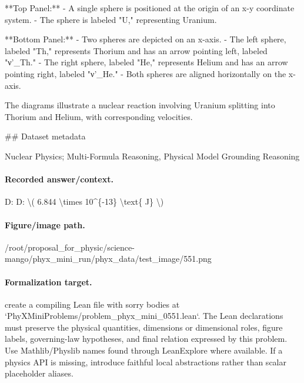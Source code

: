 **Top Panel:**
- A single sphere is positioned at the origin of an x-y coordinate system.
- The sphere is labeled "U," representing Uranium.

**Bottom Panel:**
- Two spheres are depicted on an x-axis. 
- The left sphere, labeled "Th," represents Thorium and has an arrow pointing left, labeled "ν'\_Th."
- The right sphere, labeled "He," represents Helium and has an arrow pointing right, labeled "ν'\_He."
- Both spheres are aligned horizontally on the x-axis.

The diagrams illustrate a nuclear reaction involving Uranium splitting into Thorium and Helium, with corresponding velocities.

\#\# Dataset metadata

Nuclear Physics; Multi-Formula Reasoning, Physical Model Grounding Reasoning

\paragraph{Recorded answer/context.}
D: D: \textbackslash{}( 6.844 \textbackslash{}times 10\textasciicircum{}\{-13\} \textbackslash{}text\{ J\} \textbackslash{})

\paragraph{Figure/image path.}
/root/proposal\_for\_physic/science-mango/phyx\_mini\_run/phyx\_data/test\_image/551.png

\paragraph{Formalization target.}
create a compiling Lean file with sorry bodies at `PhyXMiniProblems/problem\_phyx\_mini\_0551.lean`. The Lean declarations must preserve the physical quantities, dimensions or dimensional roles, figure labels, governing-law hypotheses, and final relation expressed by this problem.
Use Mathlib/Physlib names found through LeanExplore where available. If a physics API is missing, introduce faithful local abstractions rather than scalar placeholder aliases.

